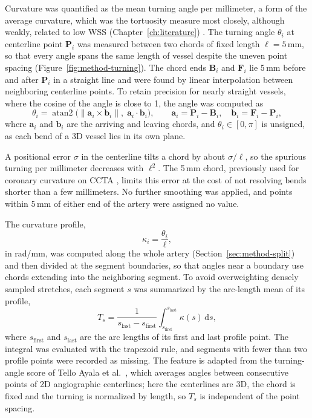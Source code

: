Curvature was quantified as the mean turning angle per millimeter, a form of the average curvature, which was the tortuosity measure most closely, although weakly, related to low WSS (Chapter~\ref{ch:literature}) \cite{kashyap2022tortuosity}.
The turning angle $\theta_i$ at centerline point $\mathbf{P}_i$ was measured between two chords of fixed length $\ell = 5$\,mm, so that every angle spans the same length of vessel despite the uneven point spacing (Figure~\ref{fig:method-turning}).
The chord ends $\mathbf{B}_i$ and $\mathbf{F}_i$ lie 5\,mm before and after $\mathbf{P}_i$ in a straight line and were found by linear interpolation between neighboring centerline points.
To retain precision for nearly straight vessels, where the cosine of the angle is close to 1, the angle was computed as
\begin{equation}
  \theta_i = \operatorname{atan2}\bigl(\lVert \mathbf{a}_i \times \mathbf{b}_i \rVert,\; \mathbf{a}_i \cdot \mathbf{b}_i\bigr),
  \qquad \mathbf{a}_i = \mathbf{P}_i - \mathbf{B}_i,\quad \mathbf{b}_i = \mathbf{F}_i - \mathbf{P}_i ,
  \label{eq:method-turn}
\end{equation}
where $\mathbf{a}_i$ and $\mathbf{b}_i$ are the arriving and leaving chords, and $\theta_i \in [0, \pi]$ is unsigned, as each bend of a 3D vessel lies in its own plane.

A positional error $\sigma$ in the centerline tilts a chord by about $\sigma/\ell$, so the spurious turning per millimeter decreases with $\ell^2$.
The 5\,mm chord, previously used for coronary curvature on CCTA \cite{vanzandwijk2019curvature}, limits this error at the cost of not resolving bends shorter than a few millimeters.
No further smoothing was applied, and points within 5\,mm of either end of the artery were assigned no value.

The curvature profile,
\begin{equation}
  \kappa_i = \frac{\theta_i}{\ell} ,
  \label{eq:method-profile}
\end{equation}
in rad/mm, was computed along the whole artery (Section~\ref{sec:method-split}) and then divided at the segment boundaries, so that angles near a boundary use chords extending into the neighboring segment.
To avoid overweighting densely sampled stretches, each segment $s$ was summarized by the arc-length mean of its profile,
\begin{equation}
  T_s = \frac{1}{s_{\mathrm{last}} - s_{\mathrm{first}}} \int_{s_{\mathrm{first}}}^{s_{\mathrm{last}}} \kappa(s)\,\mathrm{d}s ,
  \label{eq:method-tl}
\end{equation}
where $s_{\mathrm{first}}$ and $s_{\mathrm{last}}$ are the arc lengths of its first and last profile point.
The integral was evaluated with the trapezoid rule, and segments with fewer than two profile points were recorded as missing.
The feature is adapted from the turning-angle score of Tello Ayala et al.\ \cite{telloayala2026tortuosity}, which averages angles between consecutive points of 2D angiographic centerlines; here the centerlines are 3D, the chord is fixed and the turning is normalized by length, so $T_s$ is independent of the point spacing.

